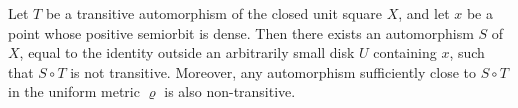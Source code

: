 Let $T$ be a transitive automorphism of the closed unit square $X$, and let $x$ be a point whose positive semiorbit is dense. Then there exists an automorphism $S$ of $X$, equal to the identity outside an arbitrarily small disk $U$ containing $x$, such that $S \circ T$ is not transitive. Moreover, any automorphism sufficiently close to $S \circ T$ in the uniform metric $\varrho$ is also non-transitive.
